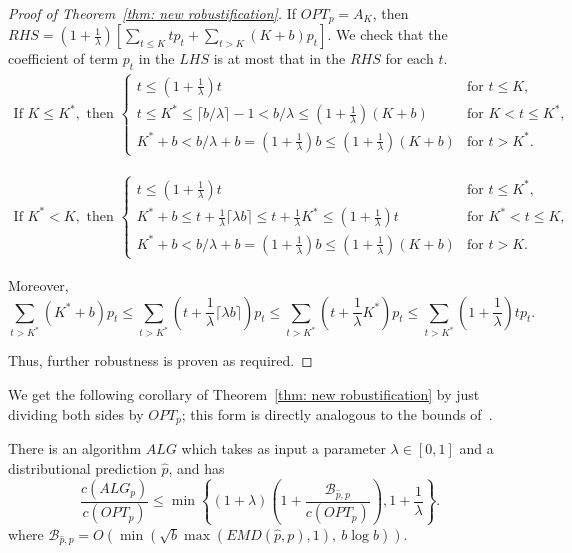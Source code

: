 \begin{proof}[Proof of Theorem~\ref{thm: new robustification}]
    
    If $OPT_p = A_K$, then $RHS=(1+\frac{1}{\lambda}) \left[ \sum_{t \leq K}tp_t + \sum_{t>K}(K+b)p_t \right]$. We check that the coefficient of term $p_t$ in the $LHS$ is at most that in the $RHS$ for each $t$. 
    \begin{align*}
    \text{If } K \leq K^*, \text{ then } 
    \begin{cases}
        t \leq (1+\frac{1}{\lambda})t & \text{for } t \leq K, \\
        t \leq K^* \leq \lceil b/\lambda \rceil - 1 < b/\lambda \leq (1+\frac{1}{\lambda})(K+b) & \text{for } K<t \leq K^*, \\
        K^* +b < b/\lambda + b = (1+\frac{1}{\lambda})b \leq (1+\frac{1}{\lambda})(K+b) & \text{for } t > K^*.
    \end{cases}
    \end{align*}
    
    
    \begin{align*}
    \text{If } K^* < K, \text{ then } 
    \begin{cases}
        t \leq (1+\frac{1}{\lambda})t & \text{for } t \leq K^*, \\
        K^* + b \leq t + \frac{1}{\lambda} \lceil \lambda b \rceil \leq t + \frac{1}{\lambda} K^* \leq (1+\frac{1}{\lambda} ) t & \text{for } K^* < t \leq K, \\
        K^* +b < b/\lambda + b = (1+\frac{1}{\lambda})b \leq (1+\frac{1}{\lambda})(K+b) & \text{for } t >K.
    \end{cases}
    \end{align*}
    
    Moreover,
    \[\sum_{t > K^*} (K^* + b)p_t  \leq \sum_{t > K^*} (t + \frac{1}{\lambda} \lceil \lambda b \rceil)p_t \leq \sum_{t > K^*} (t + \frac{1}{\lambda} K^*)p_t \leq \sum_{t > K^*} (1+\frac{1}{\lambda}) tp_t.\]

    Thus, further robustness is proven as required.
\end{proof}



We get the following corollary of Theorem~\ref{thm: new robustification} by just dividing both sides by $OPT_p$; this form is directly analogous to the bounds of~\cite{kumar2024improvingonlinealgorithmsml}. 

\begin{corollary}
    \label{cor: multiplicative bounds with robust}
    There is an algorithm $ALG$ which takes as input a parameter $\lambda \in [0,1]$ and a distributional prediction $\hat p$, and has \[\frac{c(ALG_p)}{c(OPT_p)} \leq \min \left\{ (1+\lambda)\left(1+\frac{\mathcal{B}_{\hat{p},p}}{c(OPT_p)}\right) , 1+\frac{1}{\lambda}\right\}.\]
    where $\mathcal{B}_{\hat{p},p} = O\left( \min\left(   \sqrt{b} \max\left(EMD(\hat{p},p),1\right), \ b \log b \right)\right)$.
\end{corollary}